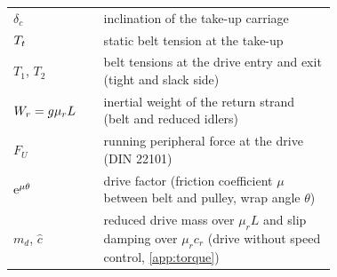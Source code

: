 \begin{table}[tp]
\begin{tabular}{@{}l>{\raggedright\arraybackslash}p{0.72\linewidth}@{}}
$\delta_c$ & inclination of the take-up carriage\\
$T_t$ & static belt tension at the take-up\\
$T_1$, $T_2$ & belt tensions at the drive entry and exit (tight and slack side)\\
$W_r=g\mu_rL$ & inertial weight of the return strand (belt and reduced idlers)\\
$F_U$ & running peripheral force at the drive (DIN 22101)\\
$\mathrm{e}^{\mu\theta}$ & drive factor (friction coefficient $\mu$ between belt and pulley, wrap angle $\theta$)\\
$m_d$, $\hat c$ & reduced drive mass over $\mu_rL$ and slip damping over $\mu_rc_r$ (drive without speed control, \cref{app:torque})\\
\bottomrule
\end{tabular}
\end{table}

